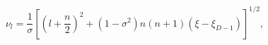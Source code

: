 \begin{equation}
\nu _{l} =\frac{1}{\sigma }\left[ \left( l+\frac{n}{2}\right)
^{2}+(1-\sigma ^{2})n(n+1)\left( \xi -\xi _{D-1}\right) \right]
^{1/2}, \label{mnulam}
\end{equation}

